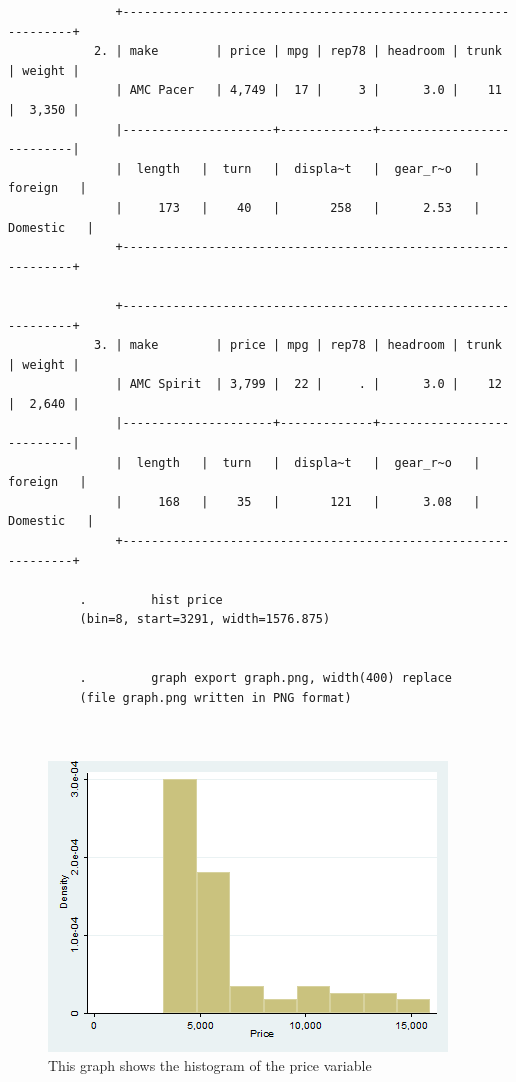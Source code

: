\documentclass{article}
\begin{document}
\begin{verbatim}
               +---------------------------------------------------------------+
            2. | make        | price | mpg | rep78 | headroom | trunk | weight |
               | AMC Pacer   | 4,749 |  17 |     3 |      3.0 |    11 |  3,350 |
               |---------------------+-------------+---------------------------|
               |  length   |  turn   |  displa~t   |  gear_r~o   |   foreign   |
               |     173   |    40   |       258   |      2.53   |  Domestic   |
               +---------------------------------------------------------------+
          
               +---------------------------------------------------------------+
            3. | make        | price | mpg | rep78 | headroom | trunk | weight |
               | AMC Spirit  | 3,799 |  22 |     . |      3.0 |    12 |  2,640 |
               |---------------------+-------------+---------------------------|
               |  length   |  turn   |  displa~t   |  gear_r~o   |   foreign   |
               |     168   |    35   |       121   |      3.08   |  Domestic   |
               +---------------------------------------------------------------+
          
          .         hist price
          (bin=8, start=3291, width=1576.875)
          
          
          .         graph export graph.png, width(400) replace
          (file graph.png written in PNG format)
          
          

\end{verbatim}



\begin{figure}[htbp]
\centering
\includegraphics{graph.png}
\caption{This graph shows the histogram of the price variable}
\end{figure}
\end{document}
